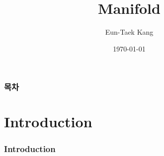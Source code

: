 \documentclass{beamer}
\title[1st Open Seminar]{Manifold}
\author[강은택]{Eun-Taek Kang \inst{1}}
\institute[Sogang Univ.]{\inst{1} Sogang Math Society}
\date[Sogang Math Society]{\today}
\begin{document}
\begin{frame}
  \maketitle
\end{frame}

\begin{frame}
  \frametitle{목차}
  \tableofcontents
\end{frame}

\section{Introduction}
\begin{frame}
  \frametitle{Introduction}

\end{frame}
\end{document}
